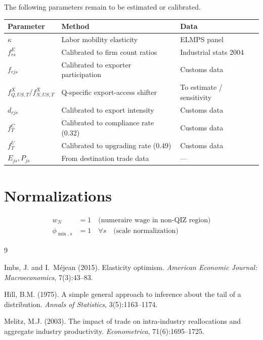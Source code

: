 \documentclass[12pt]{article}
\begin{document}
The following parameters remain to be estimated or calibrated.

\begin{center}
\begin{tabular}{lll}
\toprule
Parameter & Method & Data \\
\midrule
$\kappa$ & Labor mobility elasticity & ELMPS panel \\
$f^E_{rs}$ & Calibrated to firm count ratios & Industrial stats 2004 \\
$f_{rjs}$ & Calibrated to exporter participation & Customs data \\
$f^X_{Q,US,T}/f^X_{N,US,T}$ & Q-specific export-access shifter & To estimate / sensitivity \\
$d_{rjs}$ & Calibrated to export intensity & Customs data \\
$f^C_T$ & Calibrated to compliance rate (0.32) & Customs data \\
$f^U_T$ & Calibrated to upgrading rate (0.49) & Customs data \\
$E_{js}, P_{js}$ & From destination trade data & --- \\
\bottomrule
\end{tabular}
\end{center}

\section{Normalizations}

\begin{align}
w_N &= 1 \quad \text{(numeraire wage in non-QIZ region)} \\
\phi_{\min,s} &= 1 \quad \forall s \quad \text{(scale normalization)}
\end{align}


\begin{thebibliography}{9}

Imbs, J. and I.\ M\'{e}jean (2015).
\newblock Elasticity optimism.
\newblock \textit{American Economic Journal: Macroeconomics}, 7(3):43--83.

Hill, B.M. (1975).
\newblock A simple general approach to inference about the tail of a
distribution.
\newblock \textit{Annals of Statistics}, 3(5):1163--1174.

Melitz, M.J. (2003).
\newblock The impact of trade on intra-industry reallocations and aggregate
industry productivity.
\newblock \textit{Econometrica}, 71(6):1695--1725.

\end{thebibliography}
\end{document}
